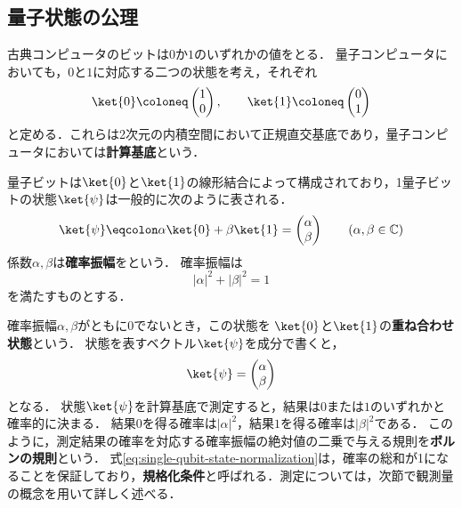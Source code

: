 \subsection{量子状態の公理}

\begin{defi}[計算基底]
  古典コンピュータのビットは$0$か$1$のいずれかの値をとる．
  量子コンピュータにおいても，$0$と$1$に対応する二つの状態を考え，それぞれ
  \begin{equation*}
    \ket{0}\coloneq\begin{pmatrix}1\\0\end{pmatrix},
    \qquad
    \ket{1}\coloneq\begin{pmatrix}0\\1\end{pmatrix}
  \end{equation*}
  と定める．これらは2次元の内積空間において正規直交基底であり，量子コンピュータにおいては\textbf{計算基底}という．

  量子ビットは$\ket{0}$と$\ket{1}$の線形結合によって構成されており，1量子ビットの状態$\ket{\psi}$は一般的に次のように表される．
  \begin{equation*}
    \ket{\psi}\eqcolon\alpha\ket{0}+\beta\ket{1} = \begin{pmatrix}\alpha\\\beta\end{pmatrix}
    \qquad
    (\alpha,\beta\in\mathbb C)
  \end{equation*}
  係数$\alpha,\beta$は\textbf{確率振幅}をという．
  確率振幅は
  \begin{equation}
    |\alpha|^2+|\beta|^2=1
    \label{eq:single-qubit-state-normalization}
  \end{equation}
  を満たすものとする．
\end{defi}

確率振幅$\alpha,\beta$がともに$0$でないとき，この状態を
$\ket{0}$と$\ket{1}$の\textbf{重ね合わせ状態}という．
状態を表すベクトル$\ket{\psi}$を成分で書くと，
\begin{equation*}
  \ket{\psi}=
  \begin{pmatrix}
    \alpha \\\beta
  \end{pmatrix}
\end{equation*}
となる．
状態$\ket{\psi}$を計算基底で測定すると，結果は$0$または$1$のいずれかと確率的に決まる．
結果$0$を得る確率は$|\alpha|^2$，結果$1$を得る確率は$|\beta|^2$である．
このように，測定結果の確率を対応する確率振幅の絶対値の二乗で与える規則を\textbf{ボルンの規則}という．
式\eqref{eq:single-qubit-state-normalization}は，確率の総和が1になることを保証しており，\textbf{規格化条件}と呼ばれる．測定については，次節で観測量の概念を用いて詳しく述べる．

